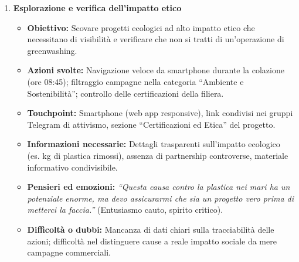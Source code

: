\documentclass[11pt,a4paper]{article}
\begin{document}
    \begin{enumerate}

        \item \textbf{Esplorazione e verifica dell'impatto etico}
        \begin{itemize}
            \item \textbf{Obiettivo:} Scovare progetti ecologici ad alto impatto etico che necessitano di visibilità e verificare che non si tratti di un'operazione di greenwashing.
            \item \textbf{Azioni svolte:} Navigazione veloce da smartphone durante la colazione (ore 08:45); filtraggio campagne nella categoria ``Ambiente e Sostenibilità''; controllo delle certificazioni della filiera.
            \item \textbf{Touchpoint:} Smartphone (web app responsive), link condivisi nei gruppi Telegram di attivismo, sezione ``Certificazioni ed Etica'' del progetto.
            \item \textbf{Informazioni necessarie:} Dettagli trasparenti sull'impatto ecologico (es. kg di plastica rimossi), assenza di partnership controverse, materiale informativo condivisibile.
            \item \textbf{Pensieri ed emozioni:} \textit{``Questa causa contro la plastica nei mari ha un potenziale enorme, ma devo assicurarmi che sia un progetto vero prima di metterci la faccia.''} (Entusiasmo cauto, spirito critico).
            \item \textbf{Difficoltà o dubbi:} Mancanza di dati chiari sulla tracciabilità delle azioni; difficoltà nel distinguere cause a reale impatto sociale da mere campagne commerciali.
        \end{itemize}


\end{enumerate}
\end{document}
